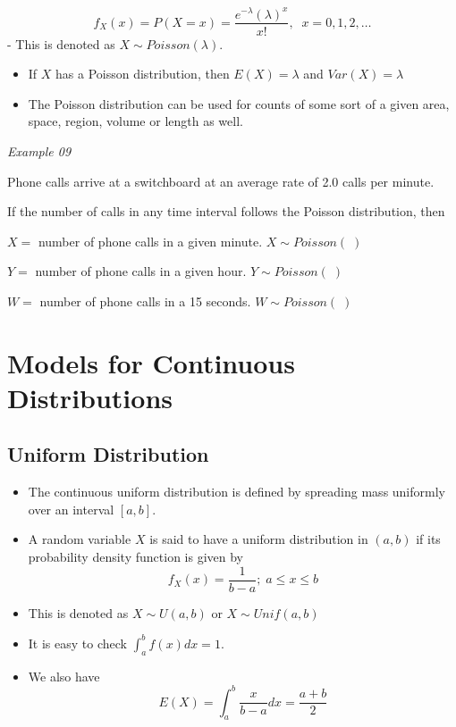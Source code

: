 \documentclass[]{book}
\begin{document}
\[f_X(x)= P(X=x)= \frac{e^{-\lambda} (\lambda)^x}{x!}  , \;\; x=0,1,2,\dots\]
- This is denoted as \(X \sim Poisson(\lambda).\)

\begin{itemize}
\item
  If \(X\) has a Poisson distribution, then \(E(X) = \lambda\) and \(Var(X) = \lambda\)
\item
  The Poisson distribution can be used for counts of some sort of a given area, space, region, volume or length as well.
\end{itemize}

\emph{Example 09}

Phone calls arrive at a switchboard at an average rate of 2.0 calls per minute.

If the number of calls in any time interval follows the Poisson distribution, then

\(X =\) number of phone calls in a given minute.
\(X \sim Poisson(\; )\)

\(Y =\) number of phone calls in a given hour.
\(Y \sim Poisson ( \;)\)

\(W =\) number of phone calls in a 15 seconds.
\(W \sim Poisson (\;)\)

\newpage

\hypertarget{models-for-continuous-distributions}{%
\section{Models for Continuous Distributions}\label{models-for-continuous-distributions}}

\hypertarget{uniform-distribution}{%
\subsection{Uniform Distribution}\label{uniform-distribution}}

\begin{itemize}
\item
  The continuous uniform distribution is defined by spreading mass uniformly over an interval \([a,b]\).
\item
  A random variable \(X\) is said to have a uniform distribution in \((a,b)\) if its probability density function is given by
  \[f_X(x) = \frac{1}{b-a};\; a\leq x\leq b\]
\item
  This is denoted as \(X\sim U(a,b)\) or \(X \sim Unif(a, b)\)
\item
  It is easy to check \(\int_a^bf(x) dx =1\).
\item
  We also have
  \[E(X) = \int_a^b\frac{x}{b-a}dx = \frac{a+b}{2}\]
\end{itemize}
\end{document}
